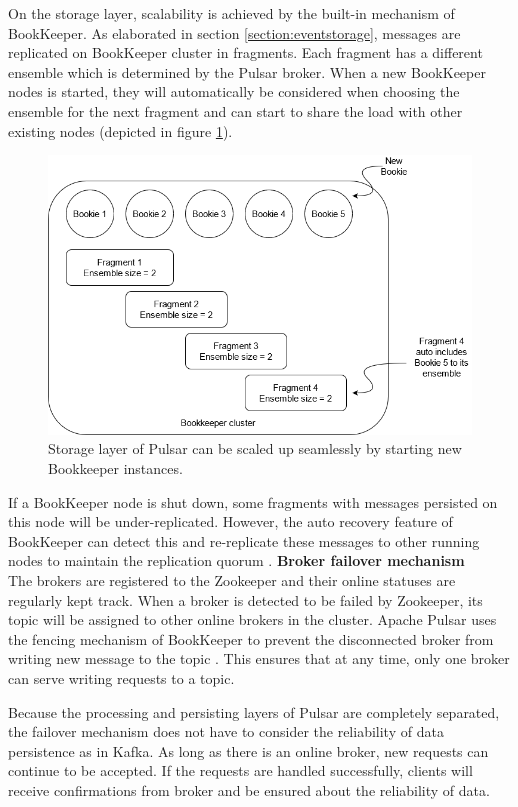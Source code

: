 On the storage layer, scalability is achieved by the built-in mechanism of BookKeeper. As elaborated in section \ref{section:eventstorage}, messages are replicated on BookKeeper cluster in fragments. Each fragment has a different ensemble which is determined by the Pulsar broker. When a new BookKeeper nodes is started, they will automatically be considered when choosing the ensemble for the next fragment and can start to share the load with other existing nodes (depicted in figure \ref{fig:scalabilitypulsar}). 
\begin{figure}[h]
	\centering
	\includegraphics[width=\linewidth]{images/scalability-pulsar.png}
	\caption{Storage layer of Pulsar can be scaled up seamlessly by starting new Bookkeeper instances.}
	\label{fig:scalabilitypulsar}
\end{figure}

If a BookKeeper node is shut down, some fragments with messages persisted on this node will be under-replicated. However, the auto recovery feature of BookKeeper can detect this and re-replicate these messages to other running nodes to maintain the replication quorum \cite{bookkeeperadmin}.
\newpage
\textbf{Broker failover mechanism}\\
The brokers are registered to the Zookeeper and their online statuses are regularly kept track. When a broker is detected to be failed by Zookeeper, its topic will be assigned to other online brokers in the cluster. Apache Pulsar uses the fencing mechanism of BookKeeper to prevent the disconnected broker from writing new message to the topic \cite{bookkeeperprotocol}. This ensures that at any time, only one broker can serve writing requests to a topic.

Because the processing and persisting layers of Pulsar are completely separated, the failover mechanism does not have to consider the reliability of data persistence as in Kafka. As long as there is an online broker, new requests can continue to be accepted. If the requests are handled successfully, clients will receive confirmations from broker and be ensured about the reliability of data. 

